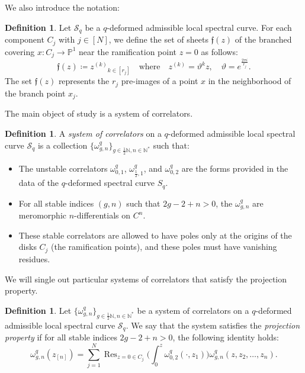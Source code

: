 \documentclass[reqno,11pt]{amsart}
\theoremstyle{plain}
\theoremstyle{definition}
\newtheorem{definition}[theorem]{Definition}
\theoremstyle{remark}
\numberwithin{equation}{section}
\renewcommand{\theta}{\vartheta}
\newcommand{\mb}[1]{\mathbb{#1}}
\newcommand{\mc}[1]{\mathcal{#1}}
\newcommand{\1}{\mathds{1}}
\newcommand{\N}{\mb{N}}
\newcommand{\2}{\frac{1}{2}}
\DeclareMathOperator*{\Res}{Res}
\begin{document}
{				We also introduce the notation:
				\begin{definition}\label{d:fz}
					Let $\mc{S}_q$ be a $q$-deformed admissible local spectral curve. For each component $C_j$ with $j \in [N]$, we define the set of sheets $	\mathfrak{f}(z)$  of the branched covering $x: C_j \to \mathbb{P}^1$ near the ramification point $z=0$ as follows:
					\begin{equation}
						\mathfrak{f}(z) \coloneqq { z^{(k)} }_{k\in [r_j]} \quad \text{where} \quad z^{(k)} = \theta^k z, \quad \theta = e^{\frac{2 \pi i}{r_j}}.
					\end{equation} 
					The set $	\mathfrak{f}(z)$ represents the $r_j$ pre-images of a point $x$ in the neighborhood of the branch point $x_j$.
				\end{definition}
				
				The main object of study is a system of correlators.
				
				\begin{definition}\label{d:system}
					A \emph{system of correlators} on a $q$-deformed admissible local spectral curve $ \mathcal{S}_q$ is a collection $ \{ \omega^{q}_{g,n} \}_{g \in \frac{1}{2} \N, n\in \N^*}$ such that:
					\begin{itemize}
						\item[(a)] The unstable correlators $ \omega^{q}_{0,1}$, $ \omega^{q}_{\frac{1}{2},1}$, and $ \omega^{q}_{0,2}$ are the forms provided in the data of the $q$-deformed spectral curve $S_q$. \item[(b)] For all stable indices $(g,n)$ such that $2g-2+n > 0$, the $ \omega^{q}_{g,n}$   are meromorphic $n$-differentials on $ C^n$.
						\item[(c)]  These stable correlators are allowed to have poles only at the origins of the disks $ C_j$ (the ramification points), and these poles must have vanishing residues.
					\end{itemize} 
				\end{definition}
				
				
				We will single out particular systems of correlators that satisfy the projection property.
				
				\begin{definition}\label{d:projection} 
					Let $ \{ \omega^{q}_{g,n} \}_{g \in \frac{1}{2} \N, n\in \N^*}$ be a system of correlators on a $q$-deformed admissible local spectral curve $\mathcal{S}_q$. We say that the system satisfies the \emph{projection property} if for all stable indices $ 2g - 2 + n > 0$, the following identity holds:
					\begin{equation}
						\omega^{q}_{g,n} (z_{[n]}) = \sum_{j=1}^{N} \Res_{z = 0 \in C_j} \Big( \int_0^z \omega^{q}_{0,2} (\mathord{\cdot},z_1) \Big) \omega^{q}_{g,n} (z, z_2, \dotsc, z_n).
					\end{equation}
				\end{definition}
				
}
\end{document}
